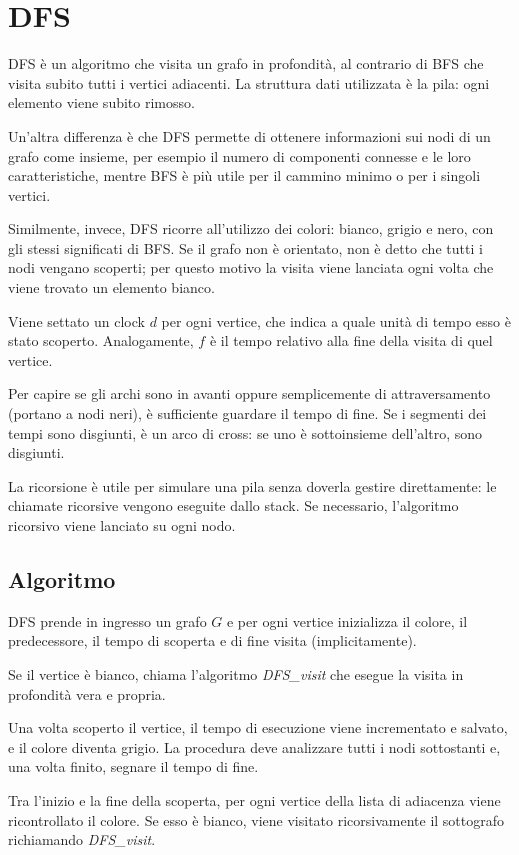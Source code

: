 \section{DFS}
DFS è un algoritmo che visita un grafo in profondità, al contrario di BFS che visita subito tutti i vertici adiacenti. La struttura dati utilizzata è la pila: ogni elemento viene subito rimosso. 

Un'altra differenza è che DFS permette di ottenere informazioni sui nodi di un grafo come insieme, per esempio il numero di componenti connesse e le loro caratteristiche, mentre BFS è più utile per il cammino minimo o per i singoli vertici.

Similmente, invece, DFS ricorre all'utilizzo dei colori: bianco, grigio e nero, con gli stessi significati di BFS. Se il grafo non è orientato, non è detto che tutti i nodi vengano scoperti; per questo motivo la visita viene lanciata ogni volta che viene trovato un elemento bianco.

Viene settato un clock $d$ per ogni vertice, che indica a quale unità di tempo esso è stato scoperto. Analogamente, $f$ è il tempo relativo alla fine della visita di quel vertice. 

Per capire se gli archi sono in avanti oppure semplicemente di attraversamento (portano a nodi neri), è sufficiente guardare il tempo di fine. Se i segmenti dei tempi sono disgiunti, è un arco di cross: se uno è sottoinsieme dell'altro, sono disgiunti.

La ricorsione è utile per simulare una pila senza doverla gestire direttamente: le chiamate ricorsive vengono eseguite dallo stack. Se necessario, l'algoritmo ricorsivo viene lanciato su ogni nodo.

\subsection{Algoritmo}
DFS prende in ingresso un grafo $G$ e per ogni vertice inizializza il colore, il predecessore, il tempo di scoperta e di fine visita (implicitamente).

Se il vertice è bianco, chiama l'algoritmo \textit{DFS\_visit} che esegue la visita in profondità vera e propria.

Una volta scoperto il vertice, il tempo di esecuzione viene incrementato e salvato, e il colore diventa grigio. La procedura deve analizzare tutti i nodi sottostanti e, una volta finito, segnare il tempo di fine. 

Tra l'inizio e la fine della scoperta, per ogni vertice della lista di adiacenza viene ricontrollato il colore. Se esso è bianco, viene visitato ricorsivamente il sottografo richiamando \textit{DFS\_visit}. 

